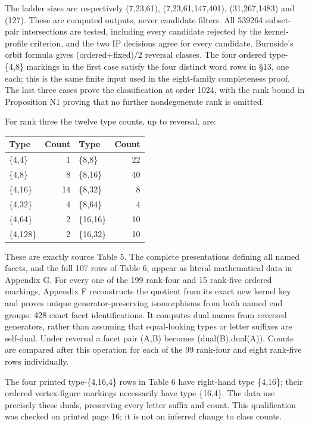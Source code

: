 \documentclass[
  10pt,
  letterpaper,
]{article}
\newcounter{none} %
\begin{document}
The ladder sizes are respectively (7,23,61), (7,23,61,147,401),
(31,267,1483) and (127). These are computed outputs, never candidate
filters. All 539264 subset-pair intersections are tested, including
every candidate rejected by the kernel-profile criterion, and the two IP
decisions agree for every candidate. Burnside's orbit formula gives
(ordered+fixed)/2 reversal classes. The four ordered type-\{4,8\}
markings in the first case satisfy the four distinct word rows in §13,
one each; this is the same finite input used in the eight-family
completeness proof. The last three cases prove the classification at
order 1024, with the rank bound in Proposition N1 proving that no
further nondegenerate rank is omitted.

For rank three the twelve type counts, up to reversal, are:

{\def\LTcaptype{none} %
\begin{longtable}[]{@{}lrlr@{}}
\toprule\noalign{}
Type & Count & Type & Count \\
\midrule\noalign{}
\endhead
\bottomrule\noalign{}
\endlastfoot
\{4,4\} & 1 & \{8,8\} & 22 \\
\{4,8\} & 8 & \{8,16\} & 40 \\
\{4,16\} & 14 & \{8,32\} & 8 \\
\{4,32\} & 4 & \{8,64\} & 4 \\
\{4,64\} & 2 & \{16,16\} & 10 \\
\{4,128\} & 2 & \{16,32\} & 10 \\
\end{longtable}
}

These are exactly source Table 5. The complete presentations defining
all named facets, and the full 107 rows of Table 6, appear as literal
mathematical data in Appendix G. For every one of the 199 rank-four and
15 rank-five ordered markings, Appendix F reconstructs the quotient from
its exact new kernel key and proves unique generator-preserving
isomorphisms from both named end groups: 428 exact facet
identifications. It computes dual names from reversed generators, rather
than assuming that equal-looking types or letter suffixes are self-dual.
Under reversal a facet pair (A,B) becomes (dual(B),dual(A)). Counts are
compared after this operation for each of the 99 rank-four and eight
rank-five rows individually.

The four printed type-\{4,16,4\} rows in Table 6 have right-hand type
\{4,16\}; their ordered vertex-figure markings necessarily have type
\{16,4\}. The data use precisely these duals, preserving every letter
suffix and count. This qualification was checked on printed page 16; it
is not an inferred change to class counts.
\end{document}
